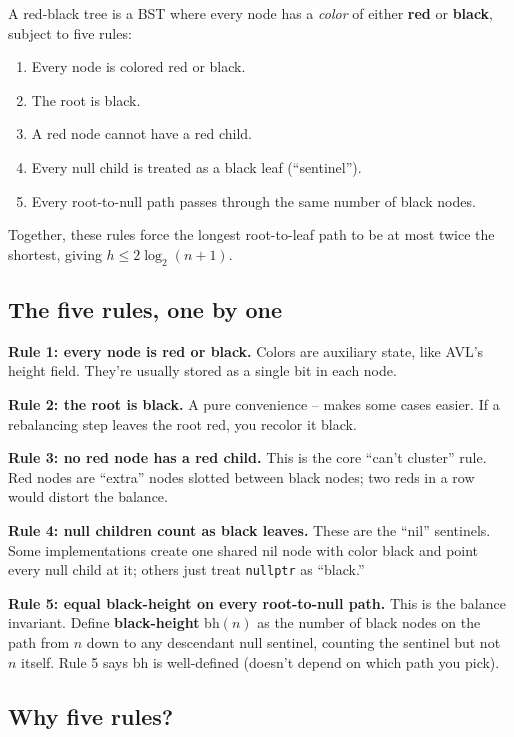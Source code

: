 \documentclass[11pt]{article}
\begin{document}
\begin{defnbox}
A red-black tree is a BST where every node has a \emph{color} of either \textbf{red} or \textbf{black}, subject to five rules:
\begin{enumerate}[leftmargin=*]
    \item Every node is colored red or black.
    \item The root is black.
    \item A red node cannot have a red child.
    \item Every null child is treated as a black leaf (``sentinel'').
    \item Every root-to-null path passes through the same number of black nodes.
\end{enumerate}
Together, these rules force the longest root-to-leaf path to be at most twice the shortest, giving $h \le 2 \log_2(n + 1)$.
\end{defnbox}

\subsection*{The five rules, one by one}

\textbf{Rule 1: every node is red or black.} Colors are auxiliary state, like AVL's height field. They're usually stored as a single bit in each node.

\textbf{Rule 2: the root is black.} A pure convenience -- makes some cases easier. If a rebalancing step leaves the root red, you recolor it black.

\textbf{Rule 3: no red node has a red child.} This is the core ``can't cluster'' rule. Red nodes are ``extra'' nodes slotted between black nodes; two reds in a row would distort the balance.

\textbf{Rule 4: null children count as black leaves.} These are the ``nil'' sentinels. Some implementations create one shared nil node with color black and point every null child at it; others just treat \texttt{nullptr} as ``black.''

\textbf{Rule 5: equal black-height on every root-to-null path.} This is the balance invariant. Define \textbf{black-height} bh$(n)$ as the number of black nodes on the path from $n$ down to any descendant null sentinel, counting the sentinel but not $n$ itself. Rule 5 says bh is well-defined (doesn't depend on which path you pick).

\subsection*{Why five rules?}
\end{document}
